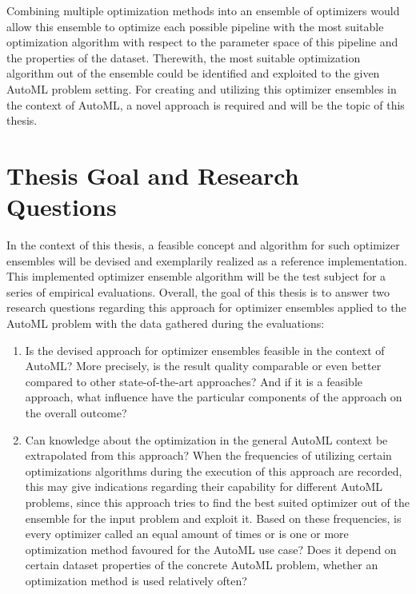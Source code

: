 Combining multiple optimization methods into an ensemble of optimizers would allow this ensemble to optimize each possible pipeline with the most suitable optimization algorithm with respect to the parameter space of this pipeline and the properties of the dataset.
Therewith, the most suitable optimization algorithm out of the ensemble could be identified and exploited to the given AutoML problem setting.\newline
For creating and utilizing this optimizer ensembles in the context of AutoML, a novel approach is required and will be the topic of this thesis. 

\section{Thesis Goal and Research Questions}
\label{sec:intro:goal}
In the context of this thesis, a feasible concept and algorithm for such optimizer ensembles will be devised and exemplarily realized as a reference implementation.
This  implemented optimizer ensemble algorithm will be the test subject for a series of empirical evaluations.\newline
Overall, the goal of this thesis is to answer two research questions regarding this approach for optimizer ensembles applied to the AutoML problem with the data gathered during the evaluations:
\begin{enumerate}
    \item Is the devised approach for optimizer ensembles feasible in the context of AutoML?
    More precisely, is the result quality comparable or even better compared to other state-of-the-art approaches?
    And if it is a feasible approach, what influence have the particular components of the approach on the overall outcome?
    \item Can knowledge about the optimization in the general AutoML context be extrapolated from this approach?
    When the frequencies of utilizing certain optimizations algorithms during the execution of this approach are recorded, this may give indications regarding their capability for different AutoML problems, since this approach tries to find the best suited optimizer out of the ensemble for the input problem and exploit it.
    Based on these frequencies, is every optimizer called an equal amount of times or is one or more optimization method favoured for the AutoML use case?
    Does it depend on certain dataset properties of the concrete AutoML problem, whether an optimization method is used relatively often?
\end{enumerate}


